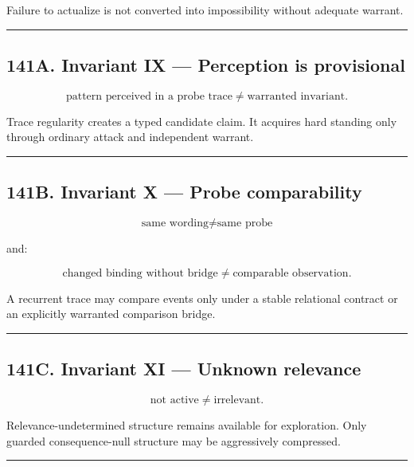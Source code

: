 \documentclass[
]{article}
\begin{document}
Failure to actualize is not converted into impossibility without
adequate warrant.

\begin{center}\rule{0.5\linewidth}{0.5pt}\end{center}


\subsection{141A. Invariant IX --- Perception is
provisional}\label{invariant-ix-perception-is-provisional}

\[
\boxed{
\text{pattern perceived in a probe trace}
\neq
\text{warranted invariant}.
}
\]

Trace regularity creates a typed candidate claim. It acquires hard standing only
through ordinary attack and independent warrant.

\begin{center}\rule{0.5\linewidth}{0.5pt}\end{center}

\subsection{141B. Invariant X --- Probe comparability}\label{invariant-x-probe-comparability}

\[
\boxed{
\text{same wording}
\neq
\text{same probe}
}
\]

and:

\[
\boxed{
\text{changed binding without bridge}
\neq
\text{comparable observation}.
}
\]

A recurrent trace may compare events only under a stable relational contract or
an explicitly warranted comparison bridge.

\begin{center}\rule{0.5\linewidth}{0.5pt}\end{center}

\subsection{141C. Invariant XI --- Unknown relevance}\label{invariant-xi-unknown-relevance}

\[
\boxed{
\text{not active}
\neq
\text{irrelevant}.
}
\]

Relevance-undetermined structure remains available for exploration. Only
guarded consequence-null structure may be aggressively compressed.

\begin{center}\rule{0.5\linewidth}{0.5pt}\end{center}
\end{document}
